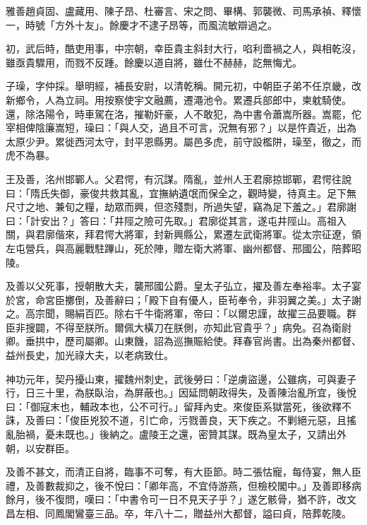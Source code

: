 \begin{pinyinscope}
 雅善趙貞固、盧藏用、陳子昂、杜審言、宋之問、畢構、郭襲微、司馬承禎、釋懷一，時號「方外十友」。餘慶才不逮子昂等，而風流敏辯過之。



 初，武后時，酷吏用事，中宗朝，幸臣貴主斜封大行，啗利嗇禍之人，與相乾沒，雖亟貴驟用，而戮不反踵。餘慶以道自將，雖仕不赫赫，訖無悔尤。



 子璪，字仲採。舉明經，補長安尉，以清乾稱。開元初，中朝臣子弟不任京畿，改新鄉令，人為立祠。用按察使宇文融薦，遷澠池令。累遷兵部郎中，柬躭騎使。還，除洛陽令，時車駕在洛，摧勒奸豪，人不敢犯，為中書令蕭嵩所器。嵩罷，佗宰相俾陰廉嵩短，璪曰：「與人交，過且不可言，況無有邪？」以是忤貴近，出為太原少尹。累徙西河太守，封平恩縣男。屬邑多虎，前守設檻阱，璪至，徹之，而虎不為暴。



 王及善，洺州邯鄲人。父君愕，有沉謀。隋亂，並州人王君廓掠邯鄲，君愕往說曰：「隋氏失御，豪俊共救其亂，宜撫納遺氓而保全之，觀時變，待真主。足下無尺寸之地、兼旬之糧，劫眾而興，但恣殘剽，所過失望，竊為足下羞之。」君廓謝曰：「計安出？」答曰：「井陘之險可先取。」君廓從其言，遂屯井陘山。高祖入關，與君廓偕來，拜君愕大將軍，封新興縣公，累遷左武衛將軍。從太宗征遼，領左屯營兵，與高麗戰駐蹕山，死於陣，贈左衛大將軍、幽州都督、邢國公，陪葬昭陵。



 及善以父死事，授朝散大夫，襲邢國公爵。皇太子弘立，擢及善左奉裕率。太子宴於宮，命宮臣擲倒，及善辭曰；「殿下自有優人，臣茍奉令，非羽翼之美。」太子謝之。高宗聞，賜絹百匹。除右千牛衛將軍，帝曰：「以爾忠謹，故擢三品要職。群臣非搜闢，不得至朕所。爾佩大橫刀在朕側，亦知此官貴乎？」病免。召為衛尉卿。垂拱中，歷司屬卿。山東饑，詔為巡撫賑給使。拜春官尚書。出為秦州都督、益州長史，加光祿大夫，以老病致仕。



 神功元年，契丹擾山東，擢魏州刺史，武後勞曰：「逆虜盜邊，公雖病，可與妻子行，日三十里，為朕臥治，為屏蔽也。」因延問朝政得失，及善陳治亂所宜，後悅曰：「御寇末也，輔政本也，公不可行。」留拜內史。來俊臣系獄當死，後欲釋不誅，及善曰：「俊臣兇狡不道，引亡命，污戮善良，天下疾之。不剿絕元惡，且搖亂胎禍，憂未既也。」後納之。盧陵王之還，密贊其謀。既為皇太子，又請出外朝，以安群臣。



 及善不甚文，而清正自將，臨事不可奪，有大臣節。時二張怙寵，每侍宴，無人臣禮，及善數裁抑之，後不悅曰：「卿年高，不宜侍游燕，但檢校閣中。」及善即移病餘月，後不復問，嘆曰：「中書令可一日不見天子乎？」遂乞骸骨，猶不許，改文昌左相、同鳳閣鸞臺三品。卒，年八十二，贈益州大都督，謚曰貞，陪葬乾陵。




\end{pinyinscope}
